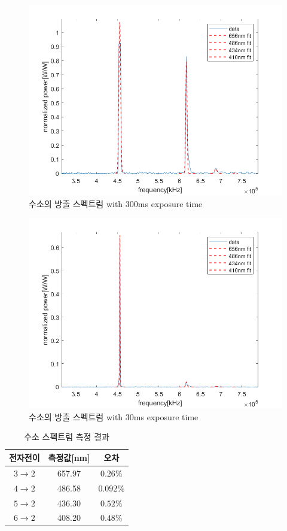 \documentclass[%
 reprint,
 amsmath,amssymb,
 aps,
]{revtex4-2}
\begin{document}
\begin{figure}[htbp]
	\includegraphics[width = 0.95\linewidth]{Hydrogen1.png}%
	\caption{\label{fig:Hydrogen1}수소의 방출 스펙트럼 with 300ms exposure time}
\end{figure}

\begin{figure}[htbp]
	\includegraphics[width = 0.95\linewidth]{Hydrogen2.png}%
	\caption{\label{fig:Hydrogen2}수소의 방출 스펙트럼 with 30ms exposure time}
\end{figure}

\begin{table}[]
\begin{tabular}{c|c|c} \hline \hline
전자전이 & 측정값[nm] & 오차 \\ \hline
$3\rightarrow 2$& 657.97 & $0.26\%$\\ \hline
$4\rightarrow 2$& 486.58 & $0.092\%$\\ \hline
$5\rightarrow 2$& 436.30 & $0.52\%$\\ \hline
$6\rightarrow 2$& 408.20 & $0.48\%$\\ \hline
\end{tabular}
\caption{\label{tab:lambda}수소 스펙트럼 측정 결과}
\end{table}
\end{document}
